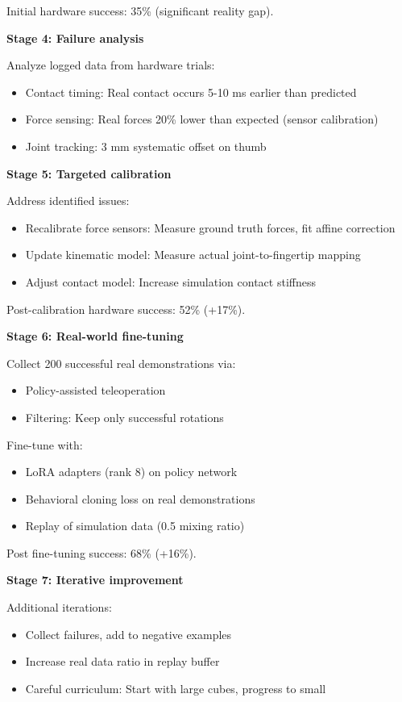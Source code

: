 \begin{example}
Initial hardware success: 35\% (significant reality gap).

\textbf{Stage 4: Failure analysis}

Analyze logged data from hardware trials:
\begin{itemize}
    \item Contact timing: Real contact occurs 5-10 ms earlier than predicted
    \item Force sensing: Real forces 20\% lower than expected (sensor calibration)
    \item Joint tracking: 3 mm systematic offset on thumb
\end{itemize}

\textbf{Stage 5: Targeted calibration}

Address identified issues:
\begin{itemize}
    \item Recalibrate force sensors: Measure ground truth forces, fit affine correction
    \item Update kinematic model: Measure actual joint-to-fingertip mapping
    \item Adjust contact model: Increase simulation contact stiffness
\end{itemize}

Post-calibration hardware success: 52\% (+17\%).

\textbf{Stage 6: Real-world fine-tuning}

Collect 200 successful real demonstrations via:
\begin{itemize}
    \item Policy-assisted teleoperation
    \item Filtering: Keep only successful rotations
\end{itemize}

Fine-tune with:
\begin{itemize}
    \item LoRA adapters (rank 8) on policy network
    \item Behavioral cloning loss on real demonstrations
    \item Replay of simulation data (0.5 mixing ratio)
\end{itemize}

Post fine-tuning success: 68\% (+16\%).

\textbf{Stage 7: Iterative improvement}

Additional iterations:
\begin{itemize}
    \item Collect failures, add to negative examples
    \item Increase real data ratio in replay buffer
    \item Careful curriculum: Start with large cubes, progress to small
\end{itemize}


\end{example}
